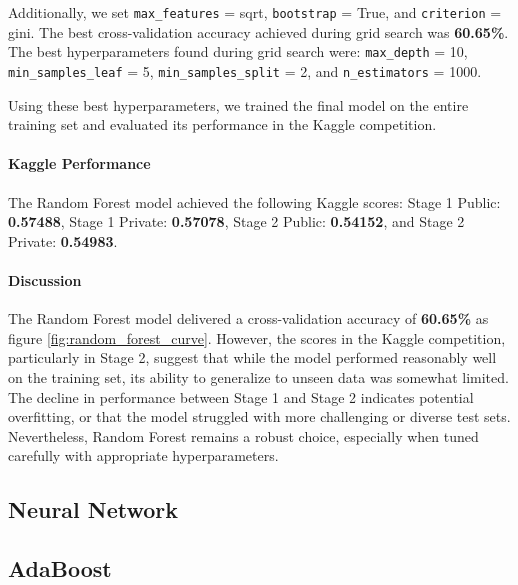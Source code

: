 \documentclass[10pt,a4paper]{article}
\begin{document}
Additionally, we set \texttt{max\_features} = sqrt, \texttt{bootstrap} = True, and \texttt{criterion} = gini. The best cross-validation accuracy achieved during grid search was \textbf{60.65\%}. The best hyperparameters found during grid search were: \texttt{max\_depth} = 10, \texttt{min\_samples\_leaf} = 5, \texttt{min\_samples\_split} = 2, and \texttt{n\_estimators} = 1000.

Using these best hyperparameters, we trained the final model on the entire training set and evaluated its performance in the Kaggle competition.

\paragraph{Kaggle Performance}

The Random Forest model achieved the following Kaggle scores: Stage 1 Public: \textbf{0.57488}, Stage 1 Private: \textbf{0.57078}, Stage 2 Public: \textbf{0.54152}, and Stage 2 Private: \textbf{0.54983}.

\paragraph{Discussion}

The Random Forest model delivered a cross-validation accuracy of \textbf{60.65\%} as figure \ref{fig:random_forest_curve}.
However, the scores in the Kaggle competition, particularly in Stage 2, suggest that while the model performed reasonably well on the training set, its ability to generalize to unseen data was somewhat limited. The decline in performance between Stage 1 and Stage 2 indicates potential overfitting, or that the model struggled with more challenging or diverse test sets. Nevertheless, Random Forest remains a robust choice, especially when tuned carefully with appropriate hyperparameters.




\subsection{Neural Network}

\subsection{AdaBoost}
\end{document}
